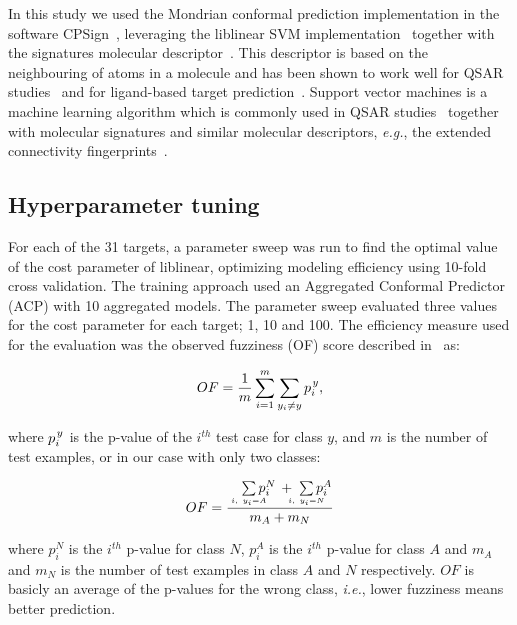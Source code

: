 \documentclass[utf8]{frontiersSCNS} %
\begin{document}
In this study we used the Mondrian conformal prediction implementation in the
software CPSign~\cite{CPSignDocs}, leveraging the
liblinear SVM implementation~\cite{fan2008liblinear} together with the
signatures molecular descriptor~\cite{faulon2003signature}.  This descriptor is
based on the neighbouring of atoms in a molecule and has been shown to work
well for QSAR studies~\cite{lapins2018confidence,Alvarsson:2016pw} and for
ligand-based target prediction~\cite{alvarsson2014ligand}. Support vector
machines is a machine learning algorithm which is commonly used in QSAR
studies~\cite{norinder2003support,zhou2011qsar} together with molecular
signatures and similar molecular descriptors, \textit{e.g.}, the extended
connectivity fingerprints~\cite{rogers2010extended}.


\subsection*{Hyperparameter tuning}
For each of the 31 targets, a parameter sweep was run to find the optimal value
of the cost parameter of liblinear, optimizing modeling efficiency using
10-fold cross validation. The training approach used an Aggregated Conformal
Predictor (ACP) with 10 aggregated models.  The parameter sweep evaluated three
values for the cost parameter for each target; 1, 10 and 100. The efficiency
measure used for the evaluation was the observed fuzziness (OF) score described
in~\cite{Vovk2016} as:

\begin{equation}
OF =\frac{ 1}{m} \sum\limits_{i=1}^{m} \sum\limits_{y_i \neq y }  p_i^{\kern1pt y},		
\end{equation}

where $p_i^{\kern1pt y}$ is the p-value of the $i^{th}$ test case for class $y$, and $m$ is the number of test examples, or in our case with only two classes:

\begin{equation}
OF =  \frac
        {\quad\sum\limits_{\mathclap{\substack{\scriptscriptstyle i,\ y_i=A}}}p_i^N \, + \;\sum\limits_{\mathclap{\substack{\scriptscriptstyle i,\ y_i=N}}}p_i^A}
        {m_A + m_N}
\end{equation}

where $p_i^N$ is the $i^{th}$ p-value for class $N$, $p_i^A$ is the $i^{th}$
p-value for class $A$ and $m_A$ and $m_N$ is the number of test examples in
class $A$ and $N$ respectively. $OF$ is basicly an average of the p-values for
the wrong class, \textit{i.e.}, lower fuzziness means better prediction.
\end{document}
